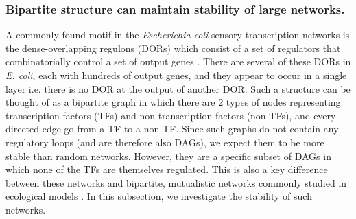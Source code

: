 \documentclass[10pt]{article}
\begin{document}
\subsubsection*{Bipartite structure can maintain stability of large networks.}
A commonly found motif in the \textit{Escherichia coli} sensory transcription networks is the dense-overlapping regulons (DORs) which consist of a set of regulators that combinatorially control a set of output genes \cite{shen2002network, alon2019introduction, alon2007network}. There are several of these DORs in \textit{E. coli}, each with hundreds of output genes, and they appear to occur in a single layer i.e. there is no DOR at the output of another DOR. Such a structure can be thought of as a bipartite graph in which there are 2 types of nodes representing transcription factors (TFs) and non-transcription factors (non-TFs), and every directed edge go from a TF to a non-TF. Since such graphs do not contain any regulatory loops (and are therefore also DAGs), we expect them to be more stable than random networks. However, they are a specific subset of DAGs in which none of the TFs are themselves regulated. This is also a key difference between these networks and bipartite, mutualistic networks commonly studied in ecological models \cite{thebault2010stability, okuyama2008network}. In this subsection, we investigate the stability of such networks. 
\end{document}
